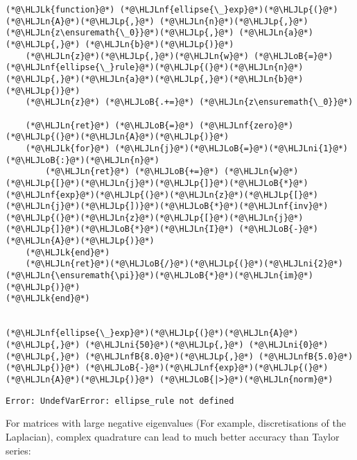 \documentclass[12pt,a4paper]{article}
\newcommand{\HLJLk}[1]{\textcolor[RGB]{148,91,176}{\textbf{#1}}}
\newcommand{\HLJLn}[1]{#1}
\newcommand{\HLJLnf}[1]{\textcolor[RGB]{66,102,213}{#1}}
\newcommand{\HLJLnfB}[1]{\textcolor[RGB]{59,151,46}{#1}}
\newcommand{\HLJLni}[1]{\textcolor[RGB]{59,151,46}{#1}}
\newcommand{\HLJLoB}[1]{\textcolor[RGB]{102,102,102}{\textbf{#1}}}
\newcommand{\HLJLp}[1]{#1}
\begin{document}
\begin{lstlisting}
(*@\HLJLk{function}@*) (*@\HLJLnf{ellipse{\_}exp}@*)(*@\HLJLp{(}@*)(*@\HLJLn{A}@*)(*@\HLJLp{,}@*) (*@\HLJLn{n}@*)(*@\HLJLp{,}@*) (*@\HLJLn{z\ensuremath{\_0}}@*)(*@\HLJLp{,}@*) (*@\HLJLn{a}@*)(*@\HLJLp{,}@*) (*@\HLJLn{b}@*)(*@\HLJLp{)}@*)
    (*@\HLJLn{z}@*)(*@\HLJLp{,}@*)(*@\HLJLn{w}@*) (*@\HLJLoB{=}@*) (*@\HLJLnf{ellipse{\_}rule}@*)(*@\HLJLp{(}@*)(*@\HLJLn{n}@*)(*@\HLJLp{,}@*)(*@\HLJLn{a}@*)(*@\HLJLp{,}@*)(*@\HLJLn{b}@*)(*@\HLJLp{)}@*)
    (*@\HLJLn{z}@*) (*@\HLJLoB{.+=}@*) (*@\HLJLn{z\ensuremath{\_0}}@*)

    (*@\HLJLn{ret}@*) (*@\HLJLoB{=}@*) (*@\HLJLnf{zero}@*)(*@\HLJLp{(}@*)(*@\HLJLn{A}@*)(*@\HLJLp{)}@*)
    (*@\HLJLk{for}@*) (*@\HLJLn{j}@*)(*@\HLJLoB{=}@*)(*@\HLJLni{1}@*)(*@\HLJLoB{:}@*)(*@\HLJLn{n}@*)
        (*@\HLJLn{ret}@*) (*@\HLJLoB{+=}@*) (*@\HLJLn{w}@*)(*@\HLJLp{[}@*)(*@\HLJLn{j}@*)(*@\HLJLp{]}@*)(*@\HLJLoB{*}@*)(*@\HLJLnf{exp}@*)(*@\HLJLp{(}@*)(*@\HLJLn{z}@*)(*@\HLJLp{[}@*)(*@\HLJLn{j}@*)(*@\HLJLp{])}@*)(*@\HLJLoB{*}@*)(*@\HLJLnf{inv}@*)(*@\HLJLp{(}@*)(*@\HLJLn{z}@*)(*@\HLJLp{[}@*)(*@\HLJLn{j}@*)(*@\HLJLp{]}@*)(*@\HLJLoB{*}@*)(*@\HLJLn{I}@*) (*@\HLJLoB{-}@*) (*@\HLJLn{A}@*)(*@\HLJLp{)}@*)
    (*@\HLJLk{end}@*)
    (*@\HLJLn{ret}@*)(*@\HLJLoB{/}@*)(*@\HLJLp{(}@*)(*@\HLJLni{2}@*)(*@\HLJLn{\ensuremath{\pi}}@*)(*@\HLJLoB{*}@*)(*@\HLJLn{im}@*)(*@\HLJLp{)}@*)
(*@\HLJLk{end}@*)


(*@\HLJLnf{ellipse{\_}exp}@*)(*@\HLJLp{(}@*)(*@\HLJLn{A}@*)(*@\HLJLp{,}@*) (*@\HLJLni{50}@*)(*@\HLJLp{,}@*) (*@\HLJLni{0}@*)(*@\HLJLp{,}@*) (*@\HLJLnfB{8.0}@*)(*@\HLJLp{,}@*) (*@\HLJLnfB{5.0}@*)(*@\HLJLp{)}@*) (*@\HLJLoB{-}@*)(*@\HLJLnf{exp}@*)(*@\HLJLp{(}@*)(*@\HLJLn{A}@*)(*@\HLJLp{)}@*) (*@\HLJLoB{|>}@*)(*@\HLJLn{norm}@*)
\end{lstlisting}

\begin{lstlisting}
Error: UndefVarError: ellipse_rule not defined
\end{lstlisting}


For matrices with large negative eigenvalues (For example, discretisations of the Laplacian), complex quadrature can lead to much better accuracy than Taylor series:
\end{document}
